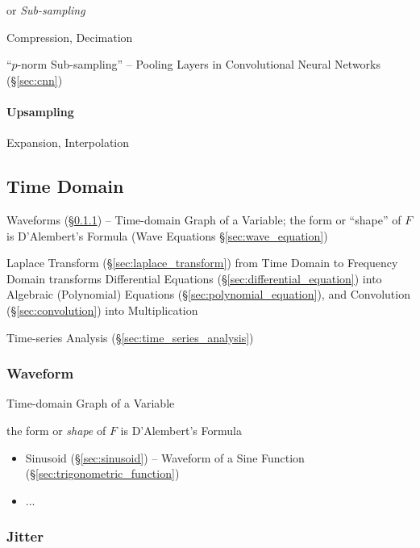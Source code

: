 or \emph{Sub-sampling}

Compression, Decimation

``$p$-norm Sub-sampling'' -- Pooling Layers in Convolutional Neural Networks
(\S\ref{sec:cnn})



\paragraph{Upsampling}\label{sec:upsampling}\hfill

Expansion, Interpolation



\subsection{Time Domain}\label{sec:time_domain}

Waveforms (\S\ref{sec:waveform}) -- Time-domain Graph of a Variable; the form or
``shape'' of $F$ is D'Alembert's Formula (Wave Equations
\S\ref{sec:wave_equation})

Laplace Transform (\S\ref{sec:laplace_transform}) from Time Domain to Frequency
Domain transforms Differential Equations (\S\ref{sec:differential_equation})
into Algebraic (Polynomial) Equations (\S\ref{sec:polynomial_equation}), and
Convolution (\S\ref{sec:convolution}) into Multiplication

\fist Time-series Analysis (\S\ref{sec:time_series_analysis})



\subsubsection{Waveform}\label{sec:waveform}

Time-domain Graph of a Variable

the form or \emph{shape} of $F$ is D'Alembert's Formula

\begin{itemize}
  \item Sinusoid (\S\ref{sec:sinusoid}) -- Waveform of a Sine Function
    (\S\ref{sec:trigonometric_function})
  \item ...
\end{itemize}



\subsubsection{Jitter}\label{sec:jitter}

